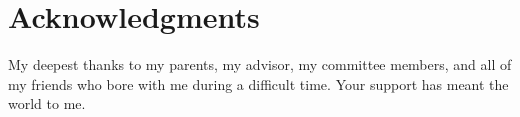 \chapter*{Acknowledgments}

My deepest thanks to my parents, my advisor, my committee members, and all of my friends who bore with me during a difficult time. Your support has meant the world to me.